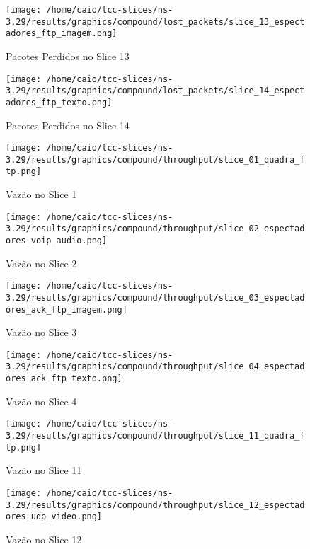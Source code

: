 \documentclass[12pt, a4paper]{article}
\begin{document}
\begin{figure}[H]
	\centering
	\texttt{[image: /home/caio/tcc-slices/ns-3.29/results/graphics/compound/lost\_packets/slice\_13\_espectadores\_ftp\_imagem.png]}
	\caption{Pacotes Perdidos no Slice 13}
	\label{lost_packets13}
\end{figure}

\begin{figure}[H]
	\centering
	\texttt{[image: /home/caio/tcc-slices/ns-3.29/results/graphics/compound/lost\_packets/slice\_14\_espectadores\_ftp\_texto.png]}
	\caption{Pacotes Perdidos no Slice 14}
	\label{lost_packets14}
\end{figure}

\begin{figure}[H]
	\centering
	\texttt{[image: /home/caio/tcc-slices/ns-3.29/results/graphics/compound/throughput/slice\_01\_quadra\_ftp.png]}
	\caption{Vazão no Slice 1}
	\label{throughput1}
\end{figure}

\begin{figure}[H]
	\centering
	\texttt{[image: /home/caio/tcc-slices/ns-3.29/results/graphics/compound/throughput/slice\_02\_espectadores\_voip\_audio.png]}
	\caption{Vazão no Slice 2}
	\label{throughput2}
\end{figure}

\begin{figure}[H]
	\centering
	\texttt{[image: /home/caio/tcc-slices/ns-3.29/results/graphics/compound/throughput/slice\_03\_espectadores\_ack\_ftp\_imagem.png]}
	\caption{Vazão no Slice 3}
	\label{throughput3}
\end{figure}

\begin{figure}[H]
	\centering
	\texttt{[image: /home/caio/tcc-slices/ns-3.29/results/graphics/compound/throughput/slice\_04\_espectadores\_ack\_ftp\_texto.png]}
	\caption{Vazão no Slice 4}
	\label{throughput4}
\end{figure}

\begin{figure}[H]
	\centering
	\texttt{[image: /home/caio/tcc-slices/ns-3.29/results/graphics/compound/throughput/slice\_11\_quadra\_ftp.png]}
	\caption{Vazão no Slice 11}
	\label{throughput11}
\end{figure}

\begin{figure}[H]
	\centering
	\texttt{[image: /home/caio/tcc-slices/ns-3.29/results/graphics/compound/throughput/slice\_12\_espectadores\_udp\_video.png]}
	\caption{Vazão no Slice 12}
	\label{throughput12}
\end{figure}
\end{document}
